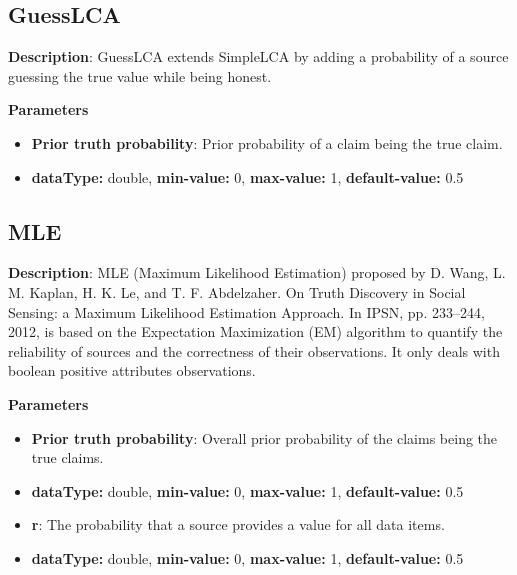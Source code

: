 \documentclass[a4paper,10pt]{scrartcl}
\begin{document}
\subsection{GuessLCA}
\begin{description}
\item \textbf{Description}: GuessLCA extends SimpleLCA by adding a probability of a source guessing the true value while being honest.
\item \textbf{Parameters}
\begin{itemize}
\item \textbf{Prior truth probability}: Prior probability of a claim being the true claim.
\item[]\textbf{dataType: }double, \textbf{min-value: }0, \textbf{max-value: }1, \textbf{default-value: }0.5\end{itemize}
\end{description}
\subsection{MLE}
\begin{description}
\item \textbf{Description}: MLE (Maximum Likelihood Estimation) proposed by D. Wang, L. M. Kaplan, H. K. Le, and T. F. Abdelzaher. On Truth Discovery in Social Sensing: a Maximum Likelihood Estimation Approach. In IPSN, pp. 233–244, 2012, is based on the Expectation Maximization (EM) algorithm to quantify the reliability of sources and the correctness of their observations. It only deals with boolean positive attributes observations.
\item \textbf{Parameters}
\begin{itemize}
\item \textbf{Prior truth probability}: Overall prior probability of the claims being the true claims.
\item[]\textbf{dataType: }double, \textbf{min-value: }0, \textbf{max-value: }1, \textbf{default-value: }0.5\item \textbf{r}: The probability that a source provides a value for all data items.
\item[]\textbf{dataType: }double, \textbf{min-value: }0, \textbf{max-value: }1, \textbf{default-value: }0.5\end{itemize}
\end{description}
\end{document}
